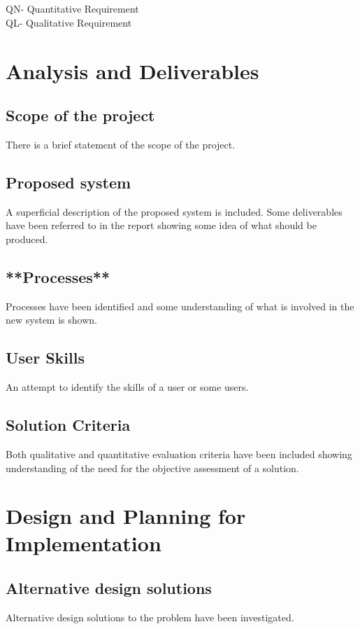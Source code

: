 \documentclass[a4paper]{article}
\begin{document}
\\ \\
\footnotesize QN- Quantitative Requirement\\
\footnotesize QL- Qualitative Requirement

\section{Analysis and Deliverables}

	\subsection{Scope of the project}
	There is a brief statement of the scope of the project.

	\subsection{Proposed system}
	A superficial description of the proposed system is included.
    Some deliverables have been referred to in the report showing some idea of what should be produced.

 	\subsection{**Processes**}
	Processes have been identified and some understanding of what is involved in the new system is shown.

	\subsection{User Skills}
	An attempt to identify the skills of a user or some users.

	\subsection{Solution Criteria}
	Both qualitative and quantitative evaluation criteria have been included showing understanding of the need for the objective assessment of a solution.

\section{Design and Planning for Implementation}

	\subsection{Alternative design solutions}
	Alternative design solutions to the problem have been investigated.

\subsection{}
\end{document}
